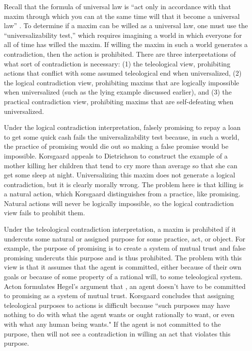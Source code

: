 \begin{isabellebody}
\begin{isamarkuptext}
Recall that the formula of universal law is “act only in accordance with that maxim through which you can at the 
same time will that it become a universal law” \cite[4:421]{groundwork}. To determine if a maxim can be willed as a 
universal law, one must use the “universalizability test,” which requires imagining a world in which 
everyone for all of time has willed the maxim. If willing the maxim in such a world generates a contradiction, 
then the action is prohibited. There are three interpretations of what sort of contradiction is necessary: 
(1) the teleological view, prohibiting actions that conflict with some assumed teleological end when 
universalized, (2) the logical contradiction view, prohibiting maxims that are logically impossible 
when universalized (such as the lying example discussed earlier), and (3) the practical contradiction view, prohibiting maxims that are self-defeating 
when universalized.

Under the logical contradiction interpretation, falsely promising to repay a loan to get some quick cash
fails the universalizability test because, in such a world, the practice of promising would die out so 
making a false promise would be impossible. Korsgaard appeals to Dietrichson \cite{dietrichson} to construct the example of 
a mother killing her children that tend to cry more than average so that she can get some 
sleep at night. Universalizing this maxim does not generate a logical contradiction, but it is clearly 
morally wrong. The problem here is that killing is a natural action, which Korsgaard distinguishes from 
a practice, like promising. Natural actions will never be logically impossible, so the logical contradiction 
view fails to prohibit them.

Under the teleological contradiction interpretation, a maxim is prohibited if it undercuts some natural 
or assigned purpose for some practice, act, or object. For example, the purpose of promising is to 
create a system of mutual trust and false promising undercuts this purpose and is thus prohibited. The problem 
with this view is that it assumes that the agent is committed, either because of their own goals or 
because of some property of a rational will, to some teleological system. Acton formulates Hegel's argument that \cite{acton},
an agent doesn't have to be committed to promising as a system of mutual trust. Korsgaard concludes that 
assigning teleological purposes to actions is difficult because ``such purposes may have
nothing to do with what the agent wants or ought rationally to want, or even with what
any human being wants." If the agent is not committed to the purpose, then will not see a contradiction 
in willing an act that violates this purpose.


\end{isamarkuptext}
\end{isabellebody}
